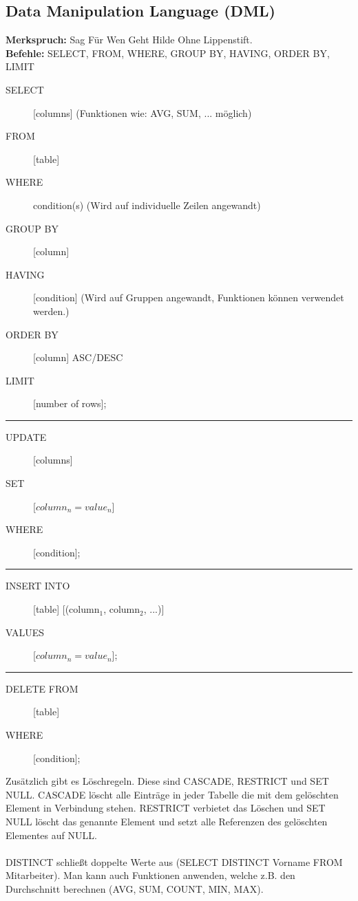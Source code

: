\documentclass[12pt,a4paper]{article}
\begin{document}
	\subsection{Data Manipulation Language (DML)}
		\textbf{Merkspruch:} Sag Für Wen Geht Hilde Ohne Lippenstift.\\
		\textbf{Befehle:} SELECT, FROM, WHERE, GROUP BY, HAVING, ORDER BY, LIMIT
		\begin{description}
			\item[SELECT] [columns] (Funktionen wie: AVG, SUM, ... möglich)
			\item[FROM] [table]
			\item[WHERE] condition(s) (Wird auf individuelle Zeilen angewandt)
			\item[GROUP BY] [column]
			\item[HAVING] [condition] (Wird auf Gruppen angewandt, Funktionen können verwendet werden.)
			\item[ORDER BY] [column] ASC/DESC
			\item[LIMIT] [number of rows];
		\end{description}
		\par\noindent\rule{\textwidth}{0.4pt}
		\begin{description}
			\item[UPDATE] [columns]
			\item[SET] [$column_n = value_n$] 
			\item[WHERE] [condition];
		\end{description}
		\par\noindent\rule{\textwidth}{0.4pt}
		\begin{description}
			\item[INSERT INTO] [table] [(column$_1$, column$_2$, ...)]
			\item[VALUES] [$column_n = value_n$];
		\end{description}
		\par\noindent\rule{\textwidth}{0.4pt}
		\begin{description}
			\item[DELETE FROM] [table]
			\item[WHERE] [condition]; 
		\end{description}
		Zusätzlich gibt es Löschregeln. Diese sind CASCADE, RESTRICT und SET NULL. CASCADE löscht alle Einträge in jeder Tabelle die mit dem gelöschten Element in Verbindung stehen. RESTRICT verbietet das Löschen und SET NULL löscht das genannte Element und setzt alle Referenzen des gelöschten Elementes auf NULL.\\\\
		DISTINCT schließt doppelte Werte aus (SELECT DISTINCT Vorname FROM Mitarbeiter). Man kann auch Funktionen anwenden, welche z.B. den Durchschnitt berechnen (AVG, SUM, COUNT, MIN, MAX).
		
\end{document}

